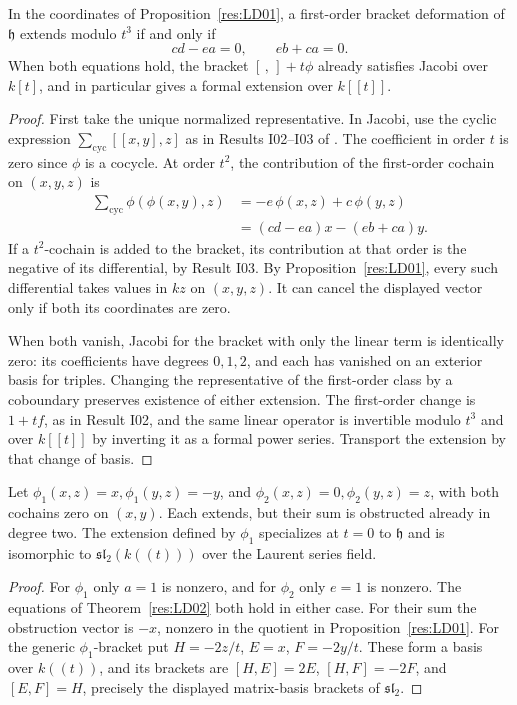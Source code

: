 \begin{theorem}
\label{res:LD02}
In the coordinates of Proposition~\ref{res:LD01}, a first-order
bracket deformation of \(\mathfrak h\) extends modulo \(t^3\)
if and only if
\[
                  cd-ea=0,\qquad eb+ca=0 .
\]
When both equations hold, the bracket \([\, ,\,]+t\phi\)
already satisfies Jacobi over \(k[t]\), and in particular gives
a formal extension over \(k[[t]]\).
\end{theorem}
\begin{proof}
First take the unique normalized representative. In Jacobi,
use the cyclic expression \(\sum_{\mathrm{cyc}}[[x,y],z]\)
as in Results I02--I03 of \cite{mg-lie}.
The coefficient in order \(t\) is zero since \(\phi\) is
a cocycle. At order \(t^2\), the contribution of the first-order
cochain on \((x,y,z)\) is
\[
 \begin{aligned}
   \sum_{\mathrm{cyc}}\phi(\phi(x,y),z)
    &= -e\,\phi(x,z)+c\,\phi(y,z)\\
    &= (cd-ea)x-(eb+ca)y .
 \end{aligned}
\]
If a \(t^2\)-cochain is added to the bracket, its contribution
at that order is the negative of its differential, by
Result I03. By Proposition~\ref{res:LD01}, every such differential
takes values in \(kz\) on \((x,y,z)\). It can cancel the
displayed vector only if both its coordinates are zero.

When both vanish, Jacobi for the bracket with only the linear
term is identically zero: its coefficients have degrees \(0,1,2\),
and each has vanished on an exterior basis for triples.
Changing the representative of the first-order class by a
coboundary preserves existence of either extension. The first-order
change is \(1+t f\), as in Result I02, and the same linear
operator is invertible modulo \(t^3\) and over \(k[[t]]\) by
inverting it as a formal power series. Transport the extension
by that change of basis.
\end{proof}

\begin{example}
\label{res:LD03}
Let \(\phi_1(x,z)=x,\phi_1(y,z)=-y\), and
\(\phi_2(x,z)=0,\phi_2(y,z)=z\), with both cochains zero
on \((x,y)\). Each extends, but their sum is obstructed
already in degree two.
The extension defined by \(\phi_1\) specializes at \(t=0\)
to \(\mathfrak h\) and is isomorphic to
\(\mathfrak{sl}_2(k((t)))\) over the Laurent series field.
\end{example}
\begin{proof}
For \(\phi_1\) only \(a=1\) is nonzero, and for \(\phi_2\)
only \(e=1\) is nonzero. The equations of
Theorem~\ref{res:LD02} both hold in either case.
For their sum the obstruction vector is \(-x\), nonzero
in the quotient in Proposition~\ref{res:LD01}.
For the generic \(\phi_1\)-bracket put
\(H=-2z/t\), \(E=x\), \(F=-2y/t\). These form a basis over
\(k((t))\), and its brackets are \([H,E]=2E\),
\([H,F]=-2F\), and \([E,F]=H\), precisely the displayed
matrix-basis brackets of \(\mathfrak{sl}_2\).
\end{proof}

